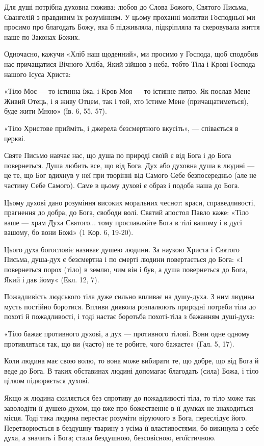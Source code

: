 \documentclass[main.tex]{subfiles}
\begin{document}
Для душі потрібна духовна пожива: любов до Слова Божого, Святого Письма, Євангелій з правдивим їх розумінням. У цьому проханні молитви Господньої ми просимо про благодать Божу, яка б підживляла, підкріпляла та скеровувала життя наше по Законах Божих.

Одночасно, кажучи «Хліб наш щоденний», ми просимо у Господа, щоб сподобив нас причащатися Вічного Хліба, Який зійшов з неба, тобто Тіла і Крові Господа нашого Ісуса Христа:
 
«Тіло Моє — то істинна їжа, і Кров Моя — то істинне питво. Як послав Мене Живий Отець, і я живу Отцем, так і той, хто їстиме Мене (причащатиметься), буде жити Мною» (їв. 6, 55, 57).

«Тіло Христове прийміть, і джерела безсмертного вкусіть», — співається в церкві.

Святе Письмо навчає нас, що душа по природі своїй є від Бога і до Бога повернеться. Душа любить все, що від Бога. Дух або духовна душа в людині — це те, що Бог вдихнув у неї при творінні від Самого Себе безпосередньо (але не частину Себе Самого). Саме в цьому духові є образ і подоба наша до Бога.

Цьому духові дано розуміння високих моральних чеснот: краси, справедливості, прагнення до добра, до Бога, свободи волі. Святий апостол Павло каже: «Тіло ваше — храм Духа Святого... тому прославляйте Бога в тілі вашому і в дусі вашому, бо вони Божі» (1 Кор. 6, 19-20).

Цього духа богословіє називає душею людини. За наукою Христа і Святого Письма, душа-дух є безсмертна і по смерті людини повертається до Бога: «І повернеться порох (тіло) в землю, чим він і був, а душа повернеться до Бога, Який і дав йому« (Екл. 12, 7).

Пожадливість людського тіла дуже сильно впливає на душу-духа. З ним людина мусть постійно боротися. Впливи диявола розпалюють природні потреби тіла до похоті й пожадливості, і тоді настає боротьба похоті-тіла з бажанням душі-духа:

«Тіло бажає противного духові, а дух — противного тілові. Вони одне одному противляться так, що ви (часто) не те робите, чого бажаєте» (Гал. 5, 17).

Коли людина має свою волю, то вона може вибирати те, що добре, що від Бога й веде до Бога. В таких обставинах людині допомагає благодать (сила) Божа, і тіло цілком підкоряється духові.

Якщо ж людина схиляється без спротиву до пожадливості тіла, то тіло може так заволодіти її душею-духом, що вже про божественне в її думках не знаходиться місця. Тоді така людина перестає розуміти віруючого в Бога, переслідує його. Перетворюється в бездушну тварину з усіма її властивостями, бо викинула з себе духа, а значить і Бога; стала бездушною, безсовісною, егоїстичною.
 
\end{document}
